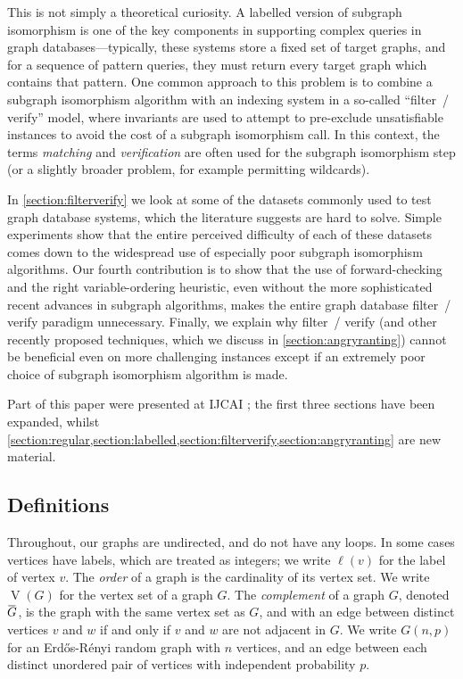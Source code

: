 \documentclass[twoside,11pt]{article}
\newcommand{\citep}[1]{\cite{#1}}
\newcommand{\shortoverline}[1]{\mkern 1.5mu\overline{\mkern-1.5mu#1\mkern-1.5mu}\mkern 1.5mu}
\begin{document}
This is not simply a theoretical curiosity. A labelled version of subgraph isomorphism is one of
the key components in supporting complex queries in graph databases---typically, these systems store
a fixed set of target graphs, and for a sequence of pattern queries, they must return every target
graph which contains that pattern.  One common approach to this problem is to combine a subgraph
isomorphism algorithm with an indexing system in a so-called ``filter~/ verify'' model, where
invariants are used to attempt to pre-exclude unsatisfiable instances to avoid the cost of a
subgraph isomorphism call. In this context, the terms \emph{matching} and \emph{verification} are
often used for the subgraph isomorphism step (or a slightly broader problem, for example permitting
wildcards).

In \cref{section:filterverify} we look at some of the datasets commonly used to test graph database
systems, which the literature suggests are hard to solve. Simple experiments show that the entire
perceived difficulty of each of these datasets comes down to the widespread use of especially poor
subgraph isomorphism algorithms. Our fourth contribution is to show that the use of forward-checking
and the right variable-ordering heuristic, even without the more sophisticated recent advances in
subgraph algorithms, makes the entire graph database filter~/ verify paradigm unnecessary.  Finally,
we explain why filter~/ verify (and other recently proposed techniques, which we discuss in
\cref{section:angryranting}) cannot be beneficial even on more challenging instances except if an
extremely poor choice of subgraph isomorphism algorithm is made.

\bigskip

Part of this paper were presented at IJCAI \citep{DBLP:conf/ijcai/McCreeshPT16}; the first three
sections have been expanded, whilst
\cref{section:regular,section:labelled,section:filterverify,section:angryranting} are new material.

\subsection{Definitions}

Throughout, our graphs are undirected, and do not have any loops. In some cases vertices have
labels, which are treated as integers; we write $\ell(v)$ for the label of vertex $v$. The
\emph{order} of a graph is the cardinality of its vertex set. We write $\operatorname{V}(G)$ for the
vertex set of a graph $G$. The \emph{complement} of a graph $G$, denoted $\shortoverline{G}$, is the
graph with the same vertex set as $G$, and with an edge between distinct vertices $v$ and $w$ if and
only if $v$ and $w$ are not adjacent in $G$. We write $G(n, p)$ for an Erd\H{o}s-R\'enyi random
graph with $n$ vertices, and an edge between each distinct unordered pair of vertices with
independent probability $p$.
\end{document}
